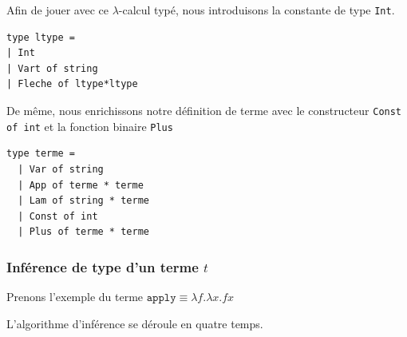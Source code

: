 \documentclass[11pt]{book}
\begin{document}
Afin de jouer avec ce $\lambda$-calcul typé, nous introduisons la constante de type \verb+Int+.


\begin{Verbatim}
type ltype = 
| Int 
| Vart of string
| Fleche of ltype*ltype
\end{Verbatim}

De même, nous enrichissons notre définition de terme avec le constructeur \verb+Const of int+ et la fonction binaire  \verb+Plus+ 
\begin{Verbatim}
type terme = 
  | Var of string 
  | App of terme * terme 
  | Lam of string * terme
  | Const of int
  | Plus of terme * terme
\end{Verbatim}

\subsubsection{Inférence de type d'un terme $t$}
Prenons l'exemple du terme 
$\mathtt{apply} \equiv \lambda f . \lambda x .fx$


L'algorithme d'inférence se déroule en quatre temps.
\end{document}
